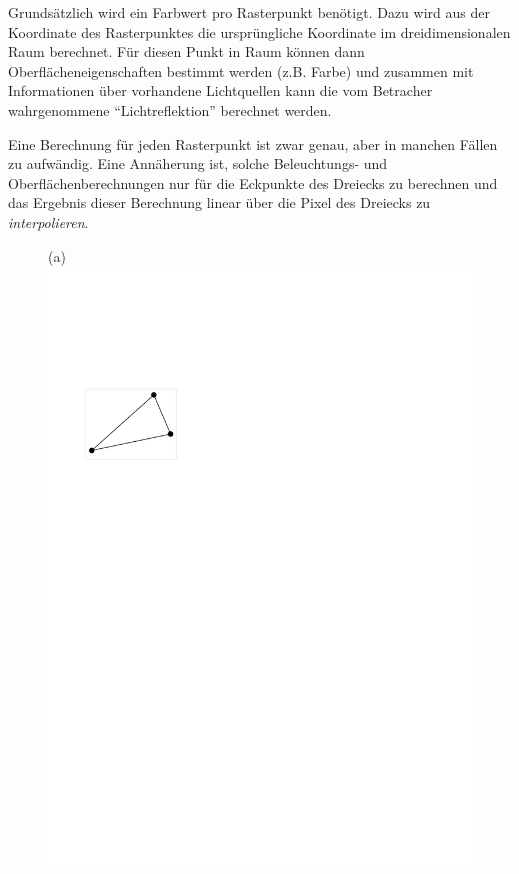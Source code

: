 \documentclass[twoside,a4paper,fleqn,12pt]{book}
\begin{document}
Grundsätzlich wird ein Farbwert pro Rasterpunkt benötigt. Dazu wird aus der Koordinate des Rasterpunktes die ursprüngliche Koordinate
im dreidimensionalen Raum berechnet. Für diesen Punkt in Raum können dann Oberflächeneigenschaften bestimmt werden
(z.B. Farbe) und zusammen mit Informationen über vorhandene Lichtquellen kann die vom Betracher wahrgenommene 
"`Lichtreflektion"' berechnet werden.

Eine Berechnung für jeden Rasterpunkt ist zwar genau, aber in manchen Fällen zu aufwändig. Eine Annäherung ist,
solche Beleuchtungs- und Oberflächenberechnungen nur für die Eckpunkte des Dreiecks zu berechnen und das Ergebnis
dieser Berechnung linear über die Pixel des Dreiecks zu \emph{interpolieren}.

\begin{figure}[h]
  \centering
  (a) \includegraphics[scale=0.8]{triraster1}
  \qquad

\end{figure}
\end{document}

